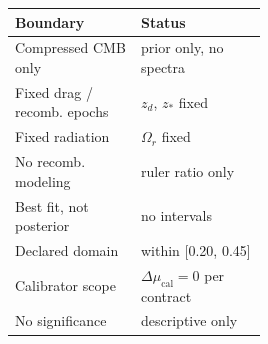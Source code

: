 {\footnotesize\setlength{\tabcolsep}{3pt}
\begin{tabular}{lp{0.50\linewidth}}
\toprule
Boundary & Status \\
\midrule
Compressed CMB only & prior only, no spectra \\
Fixed drag / recomb. epochs & $z_{d}$, $z_{*}$ fixed \\
Fixed radiation & $\Omega_{r}$ fixed \\
No recomb. modeling & ruler ratio only \\
Best fit, not posterior & no intervals \\
Declared domain & within [0.20, 0.45] \\
Calibrator scope & $\Delta\mu_{\mathrm{cal}}=0$ per contract \\
No significance & descriptive only \\
\bottomrule
\end{tabular}}
